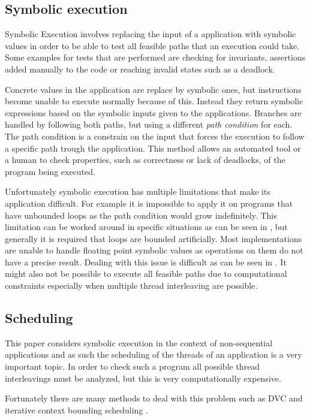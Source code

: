 \documentclass[10pt]{llncs}
\begin{document}
\subsection{Symbolic execution}

Symbolic Execution involves replacing the input of a application with symbolic values in order to be able to test all feasible paths that an execution could take. Some examples for tests that are performed are checking for invariants, assertions added manually to the code or reaching invalid states such as a deadlock.

Concrete values in the application are replace by symbolic ones, but instructions become unable to execute normally because of this. Instead they return symbolic expressions based on the symbolic inputs given to the applications. Branches are handled by following both paths, but using a different \emph{path condition} for each. The path condition is a constrain on the input that forces the execution to follow a specific path trough the application. This method allows an automated tool or a human to check properties, such as correctness or lack of deadlocks, of the program being executed.

Unfortunately symbolic execution has multiple limitations that make its application difficult. For example it is impossible to apply it on programs that have unbounded loops as the path condition would grow indefinitely. This limitation can be worked around in specific situations as can be seen in \cite{base5}, but generally it is required that loops are bounded artificially. Most implementations are unable to handle floating point symbolic values as operations on them do not have a precise result. Dealing with this issue is difficult as can be seen in \cite{base1}. It might also not be possible to execute all feasible paths due to computational constraints especially when multiple thread interleaving are possible.

\subsection{Scheduling}

This paper considers symbolic execution in the context of non-sequential applications and as such the scheduling of the threads of an application is a very important topic. In order to check such a program all possible thread interleavings must be analyzed, but this is very computationally expensive. 

Fortunately there are many methods to deal with this problem such as DVC \cite{dvc} and iterative context bounding scheduling \cite{musuvathi2007iterative}.
\end{document}
